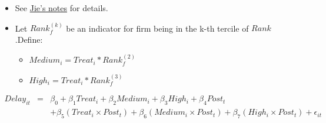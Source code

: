 \documentclass[
]{article}
\providecommand{\tightlist}{%
  \setlength{\itemsep}{0pt}\setlength{\parskip}{0pt}}
\begin{document}
\begin{itemize}
\tightlist
\item
  See
  \href{https://github.com/QuickPay-Operational-Performance/Data-and-code/blob/master/notes/Portfolio\%20model\%2B0308.pdf}{Jie's
  notes} for details.
\item
  Let \(Rank_f^{(k)}\) be an indicator for firm being in the k-th
  tercile of \(Rank\).Define:

  \begin{itemize}
  \tightlist
  \item
    \(Medium_i = Treat_i * Rank_f^{(2)}\)
  \item
    \(High_i = Treat_i * Rank_f^{(3)}\)
  \end{itemize}
\end{itemize}

\[\begin{aligned} Delay_{it}&=&\beta_0+\beta_1 Treat_i + \beta_2 Medium_i+\beta_3 High_i +\beta_4 Post_t\\ && +\beta_5( Treat_i\times Post_t) + \beta_6(Medium_i\times Post_t) + \beta_7(High_i\times Post_t) + \epsilon_{it} \end{aligned}\]
\end{document}
